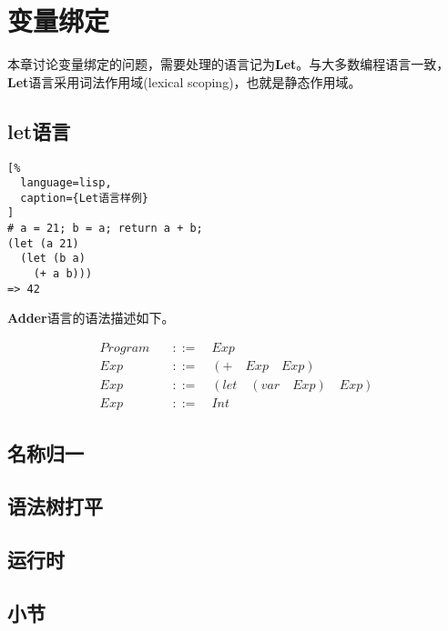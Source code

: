\chapter{变量绑定}

本章讨论变量绑定的问题，需要处理的语言记为\textbf{Let}。与大多数编程语言一致，\textbf{Let}语言采用词法作用域(lexical scoping)，也就是静态作用域。

\section{let语言}

\begin{lstlisting}[%
  language=lisp,
  caption={Let语言样例}
]
# a = 21; b = a; return a + b;
(let (a 21)
  (let (b a)
    (+ a b)))
=> 42
\end{lstlisting}


\textbf{Adder}语言的语法描述如下。

\begin{equation}
\begin{aligned}
  \label{eq:1}
   Program \quad &::= \quad Exp \\
   Exp \quad &::= \quad (+ \quad Exp \quad Exp) \\
   Exp \quad &::= \quad (let \quad (var \quad Exp) \quad Exp) \\
   Exp \quad &::=  \quad Int
\end{aligned}
\end{equation}


\section{名称归一}

\section{语法树打平}

\section{运行时}

\section{小节}